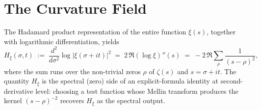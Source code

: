 \documentclass[11pt]{article}
\newcommand{\Hxi}{H_{\xi}}
\begin{document}
\section{The Curvature Field}
\label{sec:field}

The Hadamard product representation of the entire function
$\xi(s)$, together with logarithmic differentiation, yields
\begin{equation}\label{eq:Hxi}
\Hxi(\sigma,t)
\;:=\;\frac{d^2}{d\sigma^2}\log\lvert\xi(\sigma+it)\rvert^2
\;=\;2\,\Re(\log\xi)''(s)
\;=\;-2\,\Re\sum_{\rho}\frac{1}{(s-\rho)^2},
\end{equation}
where the sum runs over the non-trivial zeros $\rho$ of
$\zeta(s)$ and $s=\sigma+it$.
The quantity $\Hxi$ is the spectral (zero) side of an
explicit-formula identity at second-derivative level: choosing
a test function whose Mellin transform produces the kernel
$(s-\rho)^{-2}$ recovers $\Hxi$ as the spectral output.
\end{document}
